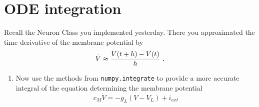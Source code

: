 \documentclass[smallheadings,12pt]{scrartcl}
\begin{document}
\section*{ODE integration}
Recall the Neuron Class you implemented yesterday. There you approximated the time derivative of the membrane potential by
\[ \dot{V}\approx\frac{V(t+h)-V(t)}{h} \textup{ .} \]
\begin{enumerate}
 \item Now use the methods from {\tt numpy.integrate} to provide a more accurate integral of the equation determining 
the membrane potential
\[c_{M}\dot{V}=-g_{L}\left(V-V_{L}\right)+i_{ext}\]

 \end{enumerate}
 
\end{document}
